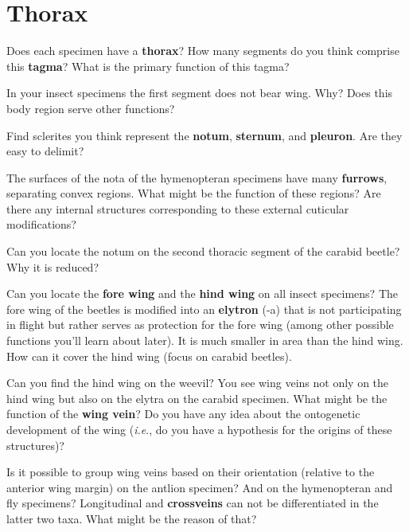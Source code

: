 \documentclass[letterpaper, 11pt]{article}
\begin{document}
\section*{Thorax}
Does each specimen have a \textbf{thorax}? How many segments do you think comprise this \textbf{tagma}? What is the primary function of this tagma? 
\vspace{30 mm}

\noindent{}In your insect specimens the first segment does not bear wing. Why? Does this body region serve other functions?
\vspace{30 mm}

\noindent{}Find sclerites you think represent the \textbf{notum}, \textbf{sternum}, and \textbf{pleuron}. Are they easy to delimit? 
\vspace{30 mm}

\noindent{}The surfaces of the nota of the hymenopteran specimens have many \textbf{furrows}, separating convex regions. What might be the function of these regions? Are there any internal structures corresponding to these external cuticular modifications?
\vspace{30 mm}

\noindent{}Can you locate the notum on the second thoracic segment of the carabid beetle? Why it is reduced?
\vspace{30 mm}

\noindent{}Can you locate the \textbf{fore wing} and the \textbf{hind wing} on all insect specimens? The fore wing of the beetles is modified into an \textbf{elytron} (-a) that is not participating in flight but rather serves as protection for the fore wing (among other possible functions you'll learn about later). It is much smaller in area than the hind wing. How can it cover the hind wing (focus on carabid beetles). 
\vspace{30 mm}

\noindent{}Can you find the hind wing on the weevil? You see wing veins not only on the hind wing but also on the elytra on the carabid specimen. What might be the function of the \textbf{wing vein}? Do you have any idea about the ontogenetic development of the wing (\textit{i.e}., do you have a hypothesis for the origins of these structures)? 
\vspace{30 mm}

\noindent{}Is it possible to group wing veins based on their orientation (relative to the anterior wing margin) on the antlion specimen? And on the hymenopteran and fly specimens? Longitudinal and \textbf{crossveins} can not be differentiated in the latter two taxa. What might be the reason of that? 
\vspace{30 mm}
\end{document}
